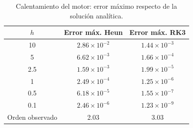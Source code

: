 \begin{table}[H]
\centering
\caption{Calentamiento del motor: error máximo respecto de la solución analítica.}
\label{tab:motor}
\begin{tabular}{ccc}
\toprule
$h$ & Error máx. Heun & Error máx. RK3 \\
\midrule
10 & $2.86\times10^{-2}$ & $1.44\times10^{-3}$ \\
5 & $6.62\times10^{-3}$ & $1.66\times10^{-4}$ \\
2.5 & $1.59\times10^{-3}$ & $1.99\times10^{-5}$ \\
1 & $2.49\times10^{-4}$ & $1.25\times10^{-6}$ \\
0.5 & $6.18\times10^{-5}$ & $1.55\times10^{-7}$ \\
0.1 & $2.46\times10^{-6}$ & $1.23\times10^{-9}$ \\
\midrule
Orden observado & 2.03 & 3.03 \\
\bottomrule
\end{tabular}
\end{table}
